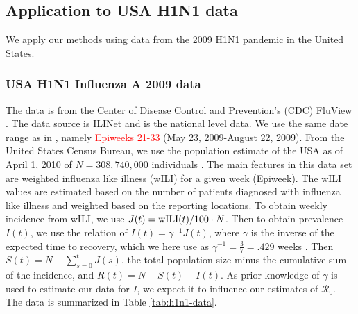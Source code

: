 \documentclass[12pt]{article}
\newcommand{\com}[1]{\textcolor{red}{ #1}}
\newcommand{\rr}{\ensuremath{\mathcal{R}_0}}
\begin{document}
      \subsection{Application to USA H1N1 data}\label{sec:real-data}
      We apply our methods using data from the 2009 H1N1 pandemic in the United States.

      \subsubsection{USA H1N1 Influenza A 2009 data}
      The data is from the Center of Disease Control and Prevention's (CDC) FluView \citep{cdc-fluview}.  The data source is ILINet and is the national level data.  We use the same date range as in \cite{towers2009}, namely \com{Epiweeks 21-33} (May 23, 2009-August 22, 2009).  From the United States Census Bureau, we use the population estimate of the USA as of April 1, 2010 of $N=308,740,000$ individuals \citep{census-2010}.  The main features in this data set are weighted influenza like illness (wILI) for a given week (Epiweek).  The wILI values are estimated based on the number of patients diagnosed with influenza like illness and weighted based on the reporting locations.  To obtain weekly incidence from wILI, we use $J(t) = \textnormal{wILI}(t) / 100 \cdot N$.  Then to obtain prevalence $I(t)$, we use the relation of $I(t) = \gamma^{-1}J(t)$, where $\gamma$ is the inverse of the expected time to recovery, which we here use as $\gamma^{-1} = \frac{3}{7}=.429$ weeks \citep{vespignani2007}.  Then $S(t) = N - \sum_{s=0}^{t}J(s)$, the total population size minus the cumulative sum of the incidence, and $R(t) = N - S(t) - I(t)$.  As prior knowledge of $\gamma$ is used to estimate our data for $I$, we expect it to influence our estimates of $\rr$.  The data is summarized in Table \ref{tab:h1n1-data}.
\end{document}
